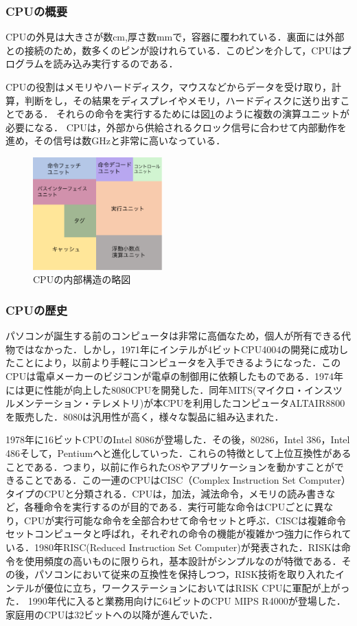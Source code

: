 \documentclass[a4j,12pt]{jsarticle}
\begin{document}
\subsubsection{CPUの概要}
CPUの外見は大きさが数cm,厚さ数mmで，容器に覆われている．裏面には外部との接続のため，数多くのピンが設けれらている．このピンを介して，CPUはプログラムを読み込み実行するのである．

CPUの役割はメモリやハードディスク，マウスなどからデータを受け取り，計算，判断をし，その結果をディスプレイやメモリ，ハードディスクに送り出すことである．
それらの命令を実行するためには図\ref{fig:cpu}のように複数の演算ユニットが必要になる．
CPUは，外部から供給されるクロック信号に合わせて内部動作を進め，その信号は数GHzと非常に高いなっている．

\begin{figure}[htbp]
 \begin{center}
  \includegraphics[width=50mm]{CPU.pdf}
 \end{center}
 \caption{CPUの内部構造の略図}
 \label{fig:cpu}
\end{figure}

\subsubsection{CPUの歴史}
パソコンが誕生する前のコンピュータは非常に高価なため，個人が所有できる代物ではなかった．しかし，1971年にインテルが4ビットCPU4004の開発に成功したことにより，以前より手軽にコンピュータを入手できるようになった．このCPUは電卓メーカーのビジコンが電卓の制御用に依頼したものである．1974年には更に性能が向上した8080CPUを開発した．同年MITS(マイクロ・インスツルメンテーション・テレメトリ)が本CPUを利用したコンピュータALTAIR8800を販売した．8080は汎用性が高く，様々な製品に組み込まれた．

1978年に16ビットCPUのIntel 8086が登場した．その後，80286，Intel 386，Intel 486そして，Pentiumへと進化していった．これらの特徴として上位互換性があることである．つまり，以前に作られたOSやアプリケーションを動かすことができることである．この一連のCPUはCISC（Complex Instruction Set Computer）タイプのCPUと分類される．CPUは，加法，減法命令，メモリの読み書きなど，各種命令を実行するのが目的である．実行可能な命令はCPUごとに異なり，CPUが実行可能な命令を全部合わせて命令セットと呼ぶ．CISCは複雑命令セットコンピュータと呼ばれ，それぞれの命令の機能が複雑かつ強力に作られている．1980年RISC(Reduced Instruction Set Computer)が発表された．RISKは命令を使用頻度の高いものに限りられ，基本設計がシンプルなのが特徴である．その後，パソコンにおいて従来の互換性を保持しつつ，RISK技術を取り入れたインテルが優位に立ち，ワークステーションにおいてはRISK CPUに軍配が上がった．
1990年代に入ると業務用向けに64ビットのCPU MIPS R4000が登場した．家庭用のCPUは32ビットへの以降が進んでいた．
\end{document}
